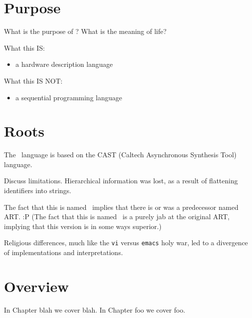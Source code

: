 \section{Purpose}
\label{sec:intro:purpose}

What is the purpose of \artxx?
What is the meaning of life?

What this IS:
\begin{itemize}
\item a hardware description language
\end{itemize}

What this IS NOT:
\begin{itemize}
\item a sequential programming language
\end{itemize}

\section{Roots}
\label{sec:intro:roots}

The \artxx\ language is based on the CAST
(Caltech Asynchronous Synthesis Tool) language.  

Discuss limitations.  
Hierarchical information was lost, as a result of 
flattening identifiers into strings.  

The fact that this is named \artxx\ implies that there is or was a 
predecessor named ART.  :P
(The fact that this is named \artxx\ is a purely jab at the original ART, 
implying that this version is in some ways superior.)

Religious differences, much like the
\texttt{vi} versus \texttt{emacs} holy war, 
led to a divergence of implementations and interpretations.  


\section{Overview}
\label{sec:intro:overview}

In Chapter blah we cover blah.  
In Chapter foo we cover foo.  


